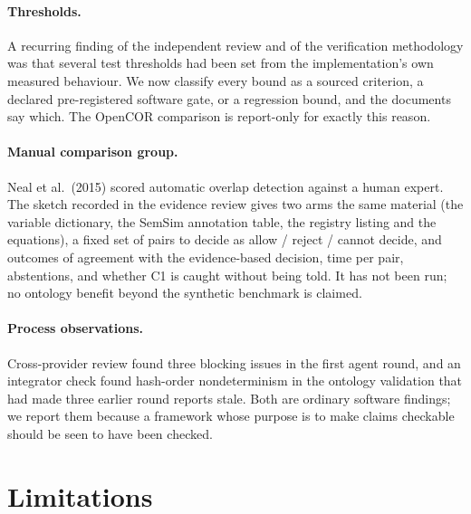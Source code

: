 \documentclass[11pt,letterpaper]{article}
\begin{document}
\paragraph{Thresholds.} A recurring finding of the independent review and of the verification methodology was that several test thresholds had been set from the implementation's own measured behaviour. We now classify every bound as a sourced criterion, a declared pre-registered software gate, or a regression bound, and the documents say which. The OpenCOR comparison is report-only for exactly this reason.

\paragraph{Manual comparison group.} Neal et al.\ (2015) scored automatic overlap detection against a human expert. The sketch recorded in the evidence review gives two arms the same material (the variable dictionary, the SemSim annotation table, the registry listing and the equations), a fixed set of pairs to decide as allow / reject / cannot decide, and outcomes of agreement with the evidence-based decision, time per pair, abstentions, and whether C1 is caught without being told. It has not been run; no ontology benefit beyond the synthetic benchmark is claimed.

\paragraph{Process observations.} Cross-provider review found three blocking issues in the first agent round, and an integrator check found hash-order nondeterminism in the ontology validation that had made three earlier round reports stale. Both are ordinary software findings; we report them because a framework whose purpose is to make claims checkable should be seen to have been checked.

\section{Limitations}
\label{sec:limitations}
\end{document}
